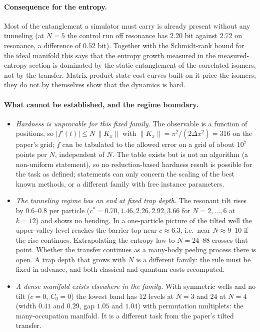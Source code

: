 \paragraph{Consequence for the entropy.}
Most of the entanglement a simulator must carry is already present without any tunneling (at $N=5$ the control run off resonance has $2.20$ bit against $2.72$ on resonance, a difference of $0.52$ bit). Together with the Schmidt-rank bound for the ideal manifold this says that the entropy growth measured in the measured-entropy section is dominated by the static entanglement of the correlated isomers, not by the transfer. Matrix-product-state cost curves built on it price the isomers; they do not by themselves show that the dynamics is hard.

\paragraph{What cannot be established, and the regime boundary.}
\begin{itemize}[itemsep=0.2em]
\item \emph{Hardness is unprovable for this fixed family.} The observable is a function of positions, so $|f'(t)|\le N\,\|K_x\|$ with $\|K_x\|=\pi^2/(2\Delta x^2)=316$ on the paper's grid; $f$ can be tabulated to the allowed error on a grid of about $10^{7}$ points per $N$, independent of $N$. The table exists but is not an algorithm (a non-uniform statement), so no reduction-based hardness result is possible for the task as defined; statements can only concern the scaling of the best known methods, or a different family with free instance parameters.
\item \emph{The tunneling regime has an end at fixed trap depth.} The resonant tilt rises by $0.6$--$0.8$ per particle ($c^\ast=0.70,1.46,2.26,2.92,3.66$ for $N=2,\dots,6$ at $k=12$) and shows no bending. In a one-particle picture of the tilted well the upper-valley level reaches the barrier top near $c\approx6.3$, i.e.\ near $N\approx9$--$10$ if the rise continues. Extrapolating the entropy law to $N=24$--$88$ crosses that point. Whether the transfer continues as a many-body peeling process there is open. A trap depth that grows with $N$ is a different family: the rule must be fixed in advance, and both classical and quantum costs recomputed.
\item \emph{A dense manifold exists elsewhere in the family.} With symmetric wells and no tilt ($c=0$, $C_0=0$) the lowest band has $12$ levels at $N=3$ and $24$ at $N=4$ (width $0.41$ and $0.29$, gap $1.05$ and $1.04$) with permutation multiplets: the many-occupation manifold. It is a different task from the paper's tilted transfer.
\end{itemize}

